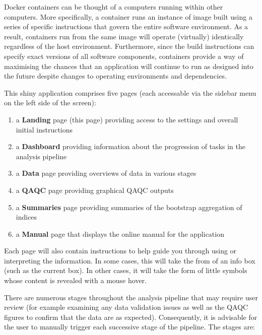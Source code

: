 \documentclass[
  8pt,
  a4paper]{article}
\providecommand{\tightlist}{%
  \setlength{\itemsep}{0pt}\setlength{\parskip}{0pt}}
\begin{document}
Docker containers can be thought of a computers running within other
computers. More specifically, a container runs an instance of image
built using a series of specific instructions that govern the entire
software environment. As a result, containers run from the same image
will operate (virtually) identically regardless of the host environment.
Furthermore, since the build instructions can specify exact versions of
all software components, containers provide a way of maximising the
chances that an application will continue to run as designed into the
future despite changes to operating environments and dependencies.

This shiny application comprises five pages (each accessable via the
sidebar menu on the left side of the screen):

\begin{enumerate}
\def\labelenumi{\arabic{enumi}.}
\tightlist
\item
  a \textbf{Landing} page (this page) providing access to the settings
  and overall initial instructions
\item
  a \textbf{Dashboard} providing information about the progression of
  tasks in the analysis pipeline
\item
  a \textbf{Data} page providing overviews of data in various stages
\item
  a \textbf{QAQC} page providing graphical QAQC outputs
\item
  a \textbf{Summaries} page providing summaries of the bootstrap
  aggregation of indices
\item
  a \textbf{Manual} page that displays the online manual for the
  application
\end{enumerate}

Each page will also contain instructions to help guide you through using
or interpreting the information. In some cases, this will take the from
of an info box (such as the current box). In other cases, it will take
the form of little {} symbols whose content is revealed with a mouse
hover.

There are numerous stages throughout the analysis pipeline that may
require user review (for example examining any data validation issues as
well as the QAQC figures to confirm that the data are as expected).
Consequently, it is advisable for the user to manually trigger each
successive stage of the pipeline. The stages are:
\end{document}
